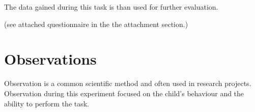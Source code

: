 The data gained during this task is than used for further evaluation.

(see attached questionnaire in the the attachment section.)



\section{Observations}

Observation is a common scientific method and often used in research projects. 
Observation during this experiment focused on the child's behaviour and the ability to perform the task.